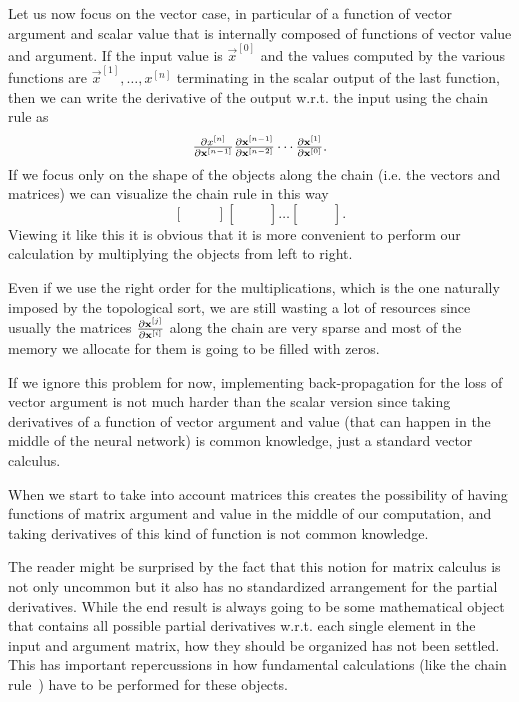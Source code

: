 \documentclass{sapthesis}
\begin{document}
\begingroup
\renewcommand\matrix{\left[\begin{array}{ccc}&&\\&&\\&&\end{array}\right]}
\renewcommand\vector{\left[\begin{array}{ccc}&&\end{array}\right]}

Let us now focus on the vector case, in particular of a function of vector
argument and scalar value that is internally composed of functions of vector
value and argument. If the input value is \(\vec x^{[0]}\) and the values
computed by the various functions are \(\vec x^{[1]}, \ldots, x^{[n]}\)
terminating in the scalar output of the last function, then we can write the
derivative of the output w.r.t. the input using the chain rule as
\[\textstyle\frac{\partial x^{[n]}}{\partial\mathbf{x}^{[n-1]}} \textstyle\frac{\partial\mathbf{x}^{[n-1]}}{\partial\mathbf{x}^{[n-2]}} \cdots \textstyle\frac{\partial\mathbf{x}^{[1]}}{\partial\mathbf{x}^{[0]}}.\] If we focus only
on the shape of the objects along the chain (i.e. the vectors and matrices) we
can visualize the chain rule in this way\[\vector \matrix \dots \matrix.\]
Viewing it like this it is obvious that it is more convenient to perform our
calculation by multiplying the objects from left to right.
\endgroup

Even if we use the right order for the multiplications, which is the one
naturally imposed by the topological sort, we are still wasting a lot of
resources since usually the matrices \(\textstyle\frac{\partial\mathbf{x}^{[j]}}{\partial\mathbf{x}^{[i]}}\) along the chain are very sparse and most of the memory we allocate
for them is going to be filled with zeros.

If we ignore this problem for now, implementing back-propagation for the loss of
vector argument is not much harder than the scalar version since taking
derivatives of a function of vector argument and value (that can happen in the
middle of the neural network) is common knowledge, just a standard vector
calculus.

When we start to take into account matrices this creates the possibility of
having functions of matrix argument and value in the middle of our computation,
and taking derivatives of this kind of function is not common knowledge.

The reader might be surprised by the fact that this notion for matrix calculus
is not only uncommon but it also has no standardized arrangement for the partial
derivatives. While the end result is always going to be some mathematical object
that contains all possible partial derivatives w.r.t. each single element in the
input and argument matrix, how they should be organized has not been settled.
This has important repercussions in how fundamental calculations (like the chain
rule~\cite{magnus2010}) have to be performed for these objects.
\end{document}
